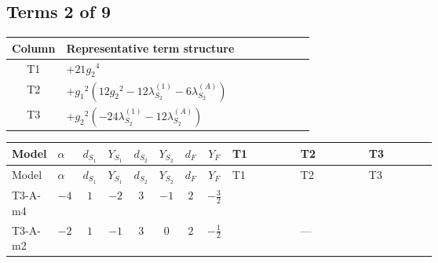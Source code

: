 \documentclass[8pt]{article}
\begin{document}
\begin{landscape}
\subsection*{Terms 2 of 9}
\begin{center}
\begin{tabular}{@{}c >{\raggedright\arraybackslash}p{0.82\linewidth}@{}}
\toprule
Column & Representative term structure \\
\midrule
T1 & \(\displaystyle +21 {g_2}^4\) \\
\midrule
T2 & \(\displaystyle +{g_1}^2 \left(12 {g_2}^2-12 {\lambda_{S_2}^{(1)}}-6 {\lambda_{S_2}^{(A)}}\right)\) \\
\midrule
T3 & \(\displaystyle +{g_2}^2 (-24 {\lambda_{S_2}^{(1)}}-12 {\lambda_{S_2}^{(A)}})\) \\
\midrule
\bottomrule
\end{tabular}
\end{center}
\smallskip
\tiny
\begin{longtable}{@{}llcccccc >{\raggedright\arraybackslash}p{0.21\linewidth} >{\raggedright\arraybackslash}p{0.21\linewidth} >{\raggedright\arraybackslash}p{0.21\linewidth}@{}}
\toprule
Model & $\alpha$ & $d_{S_1}$ & $Y_{S_1}$ & $d_{S_2}$ & $Y_{S_2}$ & $d_F$ & $Y_F$ & T1 & T2 & T3 \\
\midrule
\endfirsthead
\toprule
Model & $\alpha$ & $d_{S_1}$ & $Y_{S_1}$ & $d_{S_2}$ & $Y_{S_2}$ & $d_F$ & $Y_F$ & T1 & T2 & T3 \\
\midrule
\endhead
T3-A-m4 & $-4$ & $1$ & $-2$ & $3$ & $-1$ & $2$ & $-\frac{3}{2}$ & \scriptsize\adjustbox{max width=\linewidth}{$\begin{gathered} +21 {g_2}^4\end{gathered}$} & \scriptsize\adjustbox{max width=\linewidth}{$\begin{gathered} +{g_1}^2 \left(12 {g_2}^2-12 {\lambda_{S_2}^{(1)}}-6 {\lambda_{S_2}^{(A)}}\right)\end{gathered}$} & \scriptsize\adjustbox{max width=\linewidth}{$\begin{gathered} +{g_2}^2 (-24 {\lambda_{S_2}^{(1)}}-12 {\lambda_{S_2}^{(A)}})\end{gathered}$} \\
\midrule
T3-A-m2 & $-2$ & $1$ & $-1$ & $3$ & $0$ & $2$ & $-\frac{1}{2}$ & \scriptsize\adjustbox{max width=\linewidth}{$\begin{gathered} +21 {g_2}^4\end{gathered}$} & --- & \scriptsize\adjustbox{max width=\linewidth}{$\begin{gathered} +{g_2}^2 (-24 {\lambda_{S_2}^{(1)}}-12 {\lambda_{S_2}^{(A)}})\end{gathered}$} \\

\end{longtable}
\end{landscape}
\end{document}
